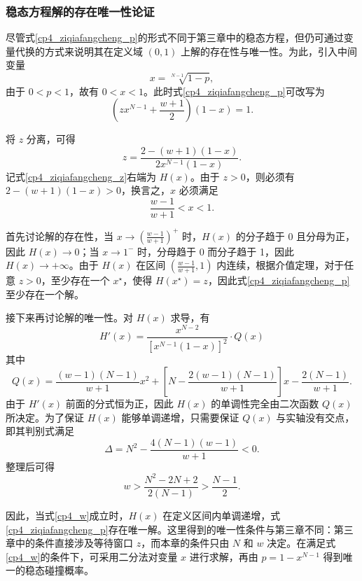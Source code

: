 \subsubsection{稳态方程解的存在唯一性论证}

尽管式\eqref{cp4_ziqiafangcheng_p}的形式不同于第三章中的稳态方程，但仍可通过变量代换的方式来说明其在定义域 $(0,1)$ 上解的存在性与唯一性。为此，引入中间变量
\[
x=\sqrt[N-1]{1-p},
\]
由于 $0<p<1$，故有 $0<x<1$。此时式\eqref{cp4_ziqiafangcheng_p}可改写为
\begin{equation}\label{cp4_ziqiafangcheng_x}
    \left(zx^{N-1}+\frac{w+1}{2}\right)(1-x)=1.
\end{equation}

将 $z$ 分离，可得
\begin{equation}\label{cp4_ziqiafangcheng_z}
    z=\frac{2-(w+1)(1-x)}{2x^{N-1}(1-x)}.
\end{equation}
记式\eqref{cp4_ziqiafangcheng_z}右端为 $H(x)$。由于 $z>0$，则必须有 $2-(w+1)(1-x)>0$，换言之，$x$ 必须满足
\[
\frac{w-1}{w+1}<x<1.
\]

首先讨论解的存在性，当 $x\to \left(\frac{w-1}{w+1}\right)^+$ 时，$H(x)$ 的分子趋于 0 且分母为正，因此 $H(x)\to 0$；当 $x\to 1^-$ 时，分母趋于 0 而分子趋于 1，因此 $H(x)\to +\infty$。由于 $H(x)$ 在区间 $\left(\frac{w-1}{w+1},1\right)$ 内连续，根据介值定理，对于任意 $z>0$，至少存在一个 $x^\star$，使得 $H(x^\star)=z$，因此式\eqref{cp4_ziqiafangcheng_p}至少存在一个解。

接下来再讨论解的唯一性。对 $H(x)$ 求导，有
\begin{equation}
    H'(x) = \frac{x^{N-2}}{\left[x^{N-1}(1-x)\right]^2} \cdot Q(x)
\end{equation}
其中
\begin{equation}
    Q(x) = \frac{(w-1)(N-1)}{w+1}x^2 + \left[N - \frac{2(w-1)(N-1)}{w+1}\right]x - \frac{2(N-1)}{w+1}.
\end{equation}
由于 $H'(x)$ 前面的分式恒为正，因此 $H(x)$ 的单调性完全由二次函数 $Q(x)$ 所决定。为了保证 $H(x)$ 能够单调递增，只需要保证 $Q(x)$ 与实轴没有交点，即其判别式满足
\begin{equation}
    \Delta = N^2 - \frac{4(N-1)(w-1)}{w+1}<0.
\end{equation}
整理后可得
\begin{equation}\label{cp4_w}
    w>\frac{N^2-2N+2}{2(N-1)}>\frac{N-1}{2}.
\end{equation}

因此，当式\eqref{cp4_w}成立时，$H(x)$ 在定义区间内单调递增，式\eqref{cp4_ziqiafangcheng_p}存在唯一解。这里得到的唯一性条件与第三章不同：第三章中的条件直接涉及等待窗口 $z$，而本章的条件只由 $N$ 和 $w$ 决定。在满足式\eqref{cp4_w}的条件下，可采用二分法对变量 $x$ 进行求解，再由 $p=1-x^{N-1}$ 得到唯一的稳态碰撞概率。

